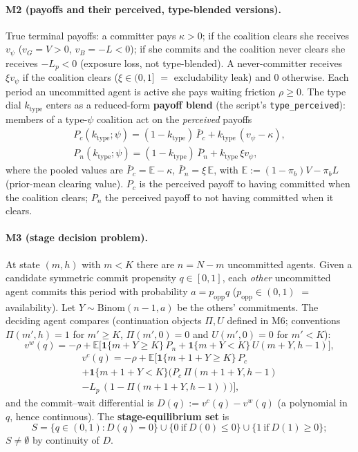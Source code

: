 \paragraph{M2 (payoffs and their perceived, type-blended versions).}
True terminal payoffs: a committer pays $\kappa>0$; if the coalition clears she receives
$v_\psi$ ($v_G=V>0$, $v_B=-L<0$); if she commits and the coalition never clears she receives
$-L_p<0$ (exposure loss, not type-blended). A never-committer receives $\xi v_\psi$ if the
coalition clears ($\xi\in(0,1]$ $=$ excludability leak) and $0$ otherwise. Each period an
uncommitted agent is active she pays waiting friction $\rho\ge 0$. The type dial
$k_{\mathrm{type}}$ enters as a reduced-form \textbf{payoff blend} (the script's
\texttt{type\_perceived}): members of a type-$\psi$ coalition act on the \emph{perceived}
payoffs
\begin{gather*}
P_c(k_{\mathrm{type}};\psi)=(1-k_{\mathrm{type}})\,\bar P_c+k_{\mathrm{type}}\,(v_\psi-\kappa),\\
P_n(k_{\mathrm{type}};\psi)=(1-k_{\mathrm{type}})\,\bar P_n+k_{\mathrm{type}}\,\xi v_\psi,
\end{gather*}
where the pooled values are $\bar P_c=\mathbb E-\kappa$, $\bar P_n=\xi\,\mathbb E$, with
$\mathbb E:=(1-\pi_b)V-\pi_b L$ (prior-mean clearing value). $P_c$ is the perceived payoff to
having committed when the coalition clears; $P_n$ the perceived payoff to not having committed
when it clears.

\paragraph{M3 (stage decision problem).}
At state $(m,h)$ with $m<K$ there are $n=N-m$ uncommitted agents. Given a candidate symmetric
commit propensity $q\in[0,1]$, each \emph{other} uncommitted agent commits this period with
probability $a=p_{\mathrm{opp}}q$ ($p_{\mathrm{opp}}\in(0,1)$ $=$ availability). Let
$Y\sim\mathrm{Binom}(n-1,a)$ be the others' commitments. The deciding agent compares
(continuation objects $\Pi,U$ defined in M6; conventions $\Pi(m',h)=1$ for $m'\ge K$,
$\Pi(m',0)=0$ and $U(m',0)=0$ for $m'<K$):
\[
v^w(q)=-\rho+\mathbb E\Big[\mathbf 1\{m+Y\ge K\}\,P_n+\mathbf 1\{m+Y<K\}\,U(m+Y,h-1)\Big],
\]
\begin{multline*}
v^c(q)=-\rho+\mathbb E\Big[\mathbf 1\{m{+}1{+}Y\ge K\}\,P_c\\
+\mathbf 1\{m{+}1{+}Y<K\}\big(P_c\,\Pi(m{+}1{+}Y,h-1)\\
-L_p\,(1-\Pi(m{+}1{+}Y,h-1))\big)\Big],
\end{multline*}
and the commit--wait differential is $D(q):=v^c(q)-v^w(q)$ (a polynomial in $q$, hence
continuous). The \textbf{stage-equilibrium set} is
\[
S=\{q\in(0,1):D(q)=0\}\cup\{0\ \text{if}\ D(0)\le 0\}\cup\{1\ \text{if}\ D(1)\ge 0\};
\]
$S\neq\emptyset$ by continuity of $D$.

